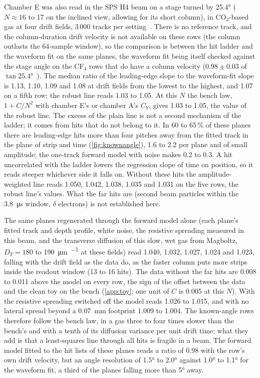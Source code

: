 Chamber E was also read in the SPS H4 beam on a stage turned by \ang{25.4} ($N \approx 16$ to 17 on the inclined view, allowing for its short column), in CO$_2$-based
gas at four drift fields, 3\,000 tracks per setting~\cite{paperI}. There is no reference track, and the column-duration drift
velocity is not available on these rows (the column outlasts the 64-sample window), so the comparison is between the hit
ladder and the waveform fit on the same planes, the waveform fit being itself checked against the stage angle
on the CF$_4$ rows that do have a column velocity ($0.98 \pm 0.03$ of $\tan\ang{25.4}$~\cite{paperI}). The median ratio of the leading-edge slope to the waveform-fit slope is
1.13, 1.10, 1.09 and 1.08 at drift fields from the lowest to the highest, and 1.07 on a fifth row; the robust line reads 1.03 to
1.05. At this $N$ the bench law, $1 + C/N^2$ with chamber E's or chamber A's $C_Y$, gives 1.03 to 1.05, the value of the robust
line. The excess of the plain line is not a second mechanism of the ladder; it comes from hits that do not belong to it. In 60
to 65\,\% of these planes there are leading-edge hits more than four pitches away from the fitted track in the plane of strip
and time (\cref{fig:knownangle}), 1.6 to 2.2 per plane and of small amplitude; the one-track forward model with noise makes 0.2
to 0.3. A hit uncorrelated with the ladder lowers the regression slope of time on position, so it reads steeper whichever side
it falls on. Without these hits the amplitude-weighted line reads 1.050, 1.042, 1.038, 1.035 and 1.031 on the five rows, the
robust line's values. What the far hits are (second beam particles within the \SI{3.8}{\micro\second} window, $\delta$ electrons)
is not established here.

The same planes regenerated through the forward model alone (each plane's fitted track and depth profile, white noise, the
resistive spreading measured in this beam, and the transverse diffusion of this slow, wet gas from Magboltz,
$D_T = 180$ to \SI{190}{\micro\metre\per{}} at these fields) read 1.040, 1.032, 1.027, 1.024 and
1.023, falling with the drift field as the data do, as the faster column puts more strips inside the readout window (13 to 16
hits). The data without the far hits are 0.008 to 0.011 above the model on every row, the sign of the offset between
the data and the clean toy on the bench (\cref{app:toy}; one unit of $C$ is 0.005 at this $N$). With the resistive spreading switched off the
model reads 1.026 to 1.015, and with no lateral spread beyond a \SI{0.07}{mm} footprint 1.009 to 1.004. The known-angle rows
therefore follow the bench law, in a gas three to four times slower than the bench's and with a tenth of its diffusion
variance per unit drift time; what they add is that a least-squares line through all hits is fragile in a beam. The forward model fitted to the hit lists of these planes reads a ratio of 0.98 with the row's own drift velocity,
but an angle resolution of \ang{1.5} to \ang{2.0} against \ang{1.0} to \ang{1.1} for the waveform fit, a third of the planes falling
more than \ang{5} away.

